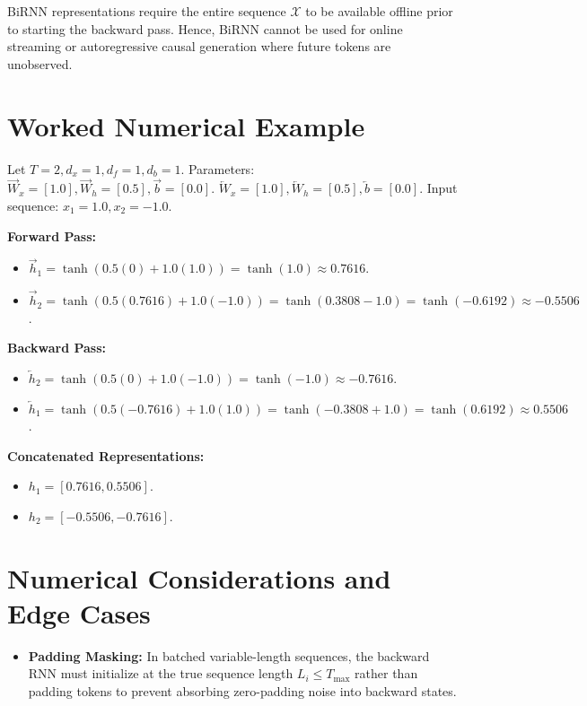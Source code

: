 \documentclass[11pt,a4paper]{article}
\theoremstyle{definition}
\begin{document}
BiRNN representations require the entire sequence $\mathcal{X}$ to be available offline prior to starting the backward pass. Hence, BiRNN cannot be used for online streaming or autoregressive causal generation where future tokens are unobserved.

\section{Worked Numerical Example}

Let $T=2, d_x=1, d_f=1, d_b=1$. Parameters:
$\overrightarrow{W}_x = [1.0], \overrightarrow{W}_h = [0.5], \overrightarrow{b} = [0.0]$.
$\overleftarrow{W}_x = [1.0], \overleftarrow{W}_h = [0.5], \overleftarrow{b} = [0.0]$.
Input sequence: $x_1 = 1.0, x_2 = -1.0$.

\textbf{Forward Pass:}
\begin{itemize}
    \item $\overrightarrow{h}_1 = \tanh(0.5(0) + 1.0(1.0)) = \tanh(1.0) \approx 0.7616$.
    \item $\overrightarrow{h}_2 = \tanh(0.5(0.7616) + 1.0(-1.0)) = \tanh(0.3808 - 1.0) = \tanh(-0.6192) \approx -0.5506$.
\end{itemize}

\textbf{Backward Pass:}
\begin{itemize}
    \item $\overleftarrow{h}_2 = \tanh(0.5(0) + 1.0(-1.0)) = \tanh(-1.0) \approx -0.7616$.
    \item $\overleftarrow{h}_1 = \tanh(0.5(-0.7616) + 1.0(1.0)) = \tanh(-0.3808 + 1.0) = \tanh(0.6192) \approx 0.5506$.
\end{itemize}

\textbf{Concatenated Representations:}
\begin{itemize}
    \item $h_1 = [0.7616, 0.5506]$.
    \item $h_2 = [-0.5506, -0.7616]$.
\end{itemize}

\section{Numerical Considerations and Edge Cases}

\begin{itemize}
    \item \textbf{Padding Masking:} In batched variable-length sequences, the backward RNN must initialize at the true sequence length $L_i \le T_{\max}$ rather than padding tokens to prevent absorbing zero-padding noise into backward states.
\end{itemize}
\end{document}
